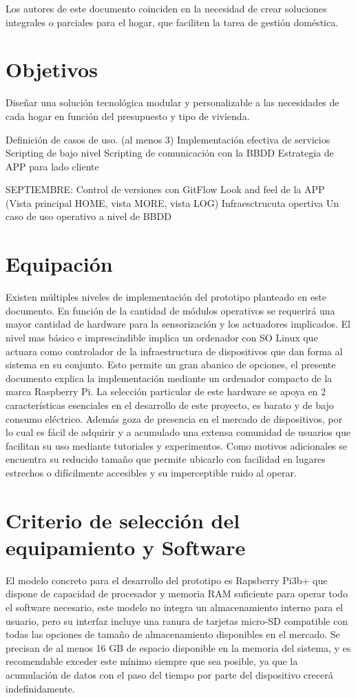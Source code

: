 Los autores de este documento coinciden en la necesidad de crear soluciones integrales o parciales para el hogar, que faciliten la tarea de gestión doméstica.


\section{Objetivos}
\label{makereference1.2}

Diseñar una solución tecnológica modular y personalizable a las necesidades de cada hogar en función del presupuesto y tipo de vivienda.

Definición de casos de uso. (al menos 3)
Implementación efectiva de servicios
Scripting de bajo nivel
Scripting de comunicación con la BBDD
Estrategia de APP para lado cliente

SEPTIEMBRE:
Control de versiones con GitFlow
Look and feel de la APP (Vista principal HOME, vista MORE, vista LOG)
Infraesctrucuta opertiva
Un caso de uso operativo a nivel de BBDD


\section{Equipación}
\label{makereference1.3}

Existen múltiples niveles de implementación del prototipo planteado en este documento. En función de la cantidad de módulos operativos se requerirá una mayor cantidad de hardware para la sensorización y los actuadores implicados. El nivel mas básico e imprescindible implica un ordenador con SO Linux que actuara como controlador de la infraestructura de dispositivos que dan forma al sistema en su conjunto. Esto permite un gran abanico de opciones, el presente documento explica la implementación mediante un ordenador compacto de la marca Raspberry Pi. La selección particular de este hardware se apoya en 2 características esenciales en el desarrollo de este proyecto, es barato y de bajo consumo eléctrico. Además goza de presencia en el mercado de dispositivos, por lo cual es fácil de adquirir y a acumulado una extensa comunidad de usuarios que facilitan su uso mediante tutoriales y experimentos. Como motivos adicionales se encuentra su reducido tamaño que permite ubicarlo con facilidad en lugares estrechos o difícilmente accesibles y su imperceptible ruido al operar.

\section{Criterio de selección del equipamiento y Software}
\label{makereference1.4}
El modelo concreto para el desarrollo del prototipo es Rapsberry Pi3b+ que dispone de capacidad de procesador y memoria RAM suficiente para operar todo el software necesario, este modelo no integra un almacenamiento interno para el usuario, pero su interfaz incluye una ranura de tarjetas micro-SD compatible con todas las opciones de tamaño de almacenamiento disponibles en el mercado. Se precisan de al menos 16 GB de espacio disponible en la memoria del sistema, y es recomendable exceder este mínimo siempre que sea posible, ya que la acumulación de datos con el paso del tiempo por parte del dispositivo crecerá indefinidamente.

